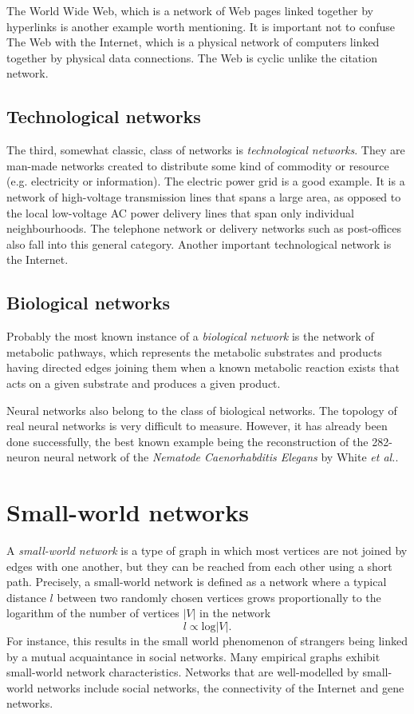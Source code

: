       The World Wide Web, which is a network of Web pages linked together by hyperlinks is another example worth mentioning. It is important not to confuse The Web with the Internet, which is a physical network of computers linked together by physical data connections. The Web is cyclic unlike the citation network.
        
    \subsection{Technological networks}

      The third, somewhat classic, class of networks is \emph{technological networks}. They are man-made networks created to distribute some kind of commodity or resource (e.g. electricity or information). The electric power grid is a good example. It is a network of high-voltage transmission lines that spans a large area, as opposed to the local low-voltage AC power delivery lines that span only individual neighbourhoods. The telephone network or delivery networks such as post-offices also fall into this general category. Another important technological network is the Internet.

    \subsection{Biological networks}

      Probably the most known instance of a \emph{biological network} is the network of metabolic pathways, which represents the metabolic substrates and products having directed edges joining them when a known metabolic reaction exists that acts on a given substrate and produces a given product.

      Neural networks also belong to the class of biological networks. The topology of real neural networks is very difficult to measure. However, it has already been done successfully, the best known example being the reconstruction of the 282-neuron neural network of the \textit{Nematode Caenorhabditis Elegans} by White \emph{et al.}\cite{White1986}.
  
  \section{Small-world networks}

    A \emph{small-world network} is a type of graph in which most vertices are not joined by edges with one another, but they can be reached from each other using a short path. Precisely, a small-world network is defined as a network where a typical distance $l$ between two randomly chosen vertices grows proportionally to the logarithm of the number of vertices $|V|$ in the network\cite{WattsStrogatz1998}
    \begin{equation}
    l \propto \mbox{log}|V| \mbox{.}
    \end{equation}
    For instance, this results in the small world phenomenon of strangers being linked by a mutual acquaintance in social networks. Many empirical graphs exhibit small-world network characteristics. Networks that are well-modelled by small-world networks include social networks, the connectivity of the Internet and gene networks.

